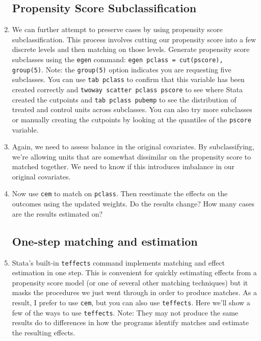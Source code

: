 \documentclass[a4paper,12pt]{article}
\begin{document}
\begin{enumerate}
\subsection*{Propensity Score Subclassification}

\item We can further attempt to preserve cases by using propensity score subclassification. This process involves cutting our propensity score into a few discrete levels and then matching on those levels. Generate propensity score subclasses using the \texttt{egen} command: \texttt{egen pclass = cut(pscore), group(5)}. Note: the \texttt{group(5)} option indicates you are requesting five subclasses. You can use \texttt{tab pclass} to confirm that this variable has been created correctly and \texttt{twoway scatter pclass pscore} to see where Stata created the cutpoints and \texttt{tab pclass pubemp} to see the distribution of treated and control units across subclasses. You can also try more subclasses or manually creating the cutpoints by looking at the quantiles of the \texttt{pscore} variable.
\item Again, we need to assess balance in the original covariates. By subclassifying, we're allowing units that are somewhat dissimilar on the propensity score to matched together. We need to know if this introduces imbalance in our original covariates.
\item Now use \texttt{cem} to match on \texttt{pclass}. Then reestimate the effects on the outcomes using the updated weights. Do the results change? How many cases are the results estimated on?


\subsection*{One-step matching and estimation}

\item Stata's built-in \texttt{teffects} command implements matching and effect estimation in one step. This is convenient for quickly estimating effects from a propensity score model (or one of several other matching techniques) but it masks the procedures we just went through in order to produce matches. As a result, I prefer to use \texttt{cem}, but you can also use \texttt{teffects}. Here we'll show a few of the ways to use \texttt{teffects}. Note: They may not produce the same results do to differences in how the programs identify matches and estimate the resulting effects.


\end{enumerate}
\end{document}
